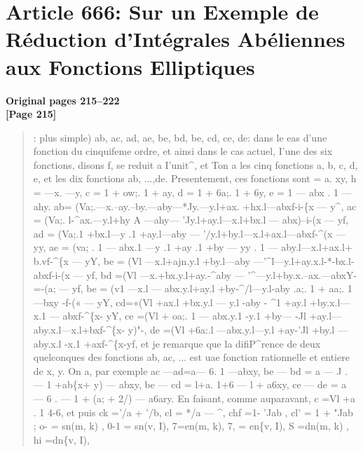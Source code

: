 \documentclass[11pt,a4paper]{book}
\begin{document}
\newpage

\section*{Article 666: Sur un Exemple de R\'eduction d'Int\'egrales Ab\'eliennes aux Fonctions Elliptiques}
\textbf{Original pages 215--222}\\[0.3cm]

\textbf{[Page 215]}\\[0.2cm]
\begin{quote}
:
plus simple) ab, ac, ad, ae, be, bd, be, cd, ce, de: dans le eas d'une fonction du
cinquifeme ordre, et ainsi dans le cas actuel, I'une des six fonctions, disons f, se reduit
a I'unit\textasciicircum{}, et Ton a les cinq fonctions a, b, c, d, e, et les dix fonctions ab, ...,de.
Presentement, ces fonctions sont
=
a. xy,
h =  ---x. ---y,
c = 1 + ow;. 1 + ay,
d = 1 + 6a;. 1 + 6y,
e = 1 --- abx . 1 --- ahy.
ab= (Va;.---x.--ay.--by.---aby---*Jy.---y.l+ax. +hx.l---abxf-i-\{x ---
y\textasciicircum{},
ac = (Va;. l-\textasciicircum{}ax.---y.l+hy A ---ahy--- 'Jy.l+ay.l---x.l+bx.l --- abx)--i-(x --- yf,
ad = (Va;.1 +bx.l---y .1 +ay.l---aby --- '/y.l+by.l---x.l+ax.l---abxf-\textasciicircum{}(x --- yy,
ae = (va; . 1 --- abx.1 ---y .1 +ay .1 +by --- yy . 1 --- aby.l---x.l+ax.l+ b.vf-\textasciicircum{}\{x --- yY,
be = (Vl ---x.l+ajn.y.l +by.l---aby ---'\textasciicircum{}l---y.l+ay.x.l-*-bx.l-abxf-i-(x --- yf,
bd =(Vl ---x.+bx.y.l+ay.-\textasciicircum{}aby --- '\textasciicircum{}---y.l+by.x.--ax.---abxY-=-(a; ---
yf,
be = (v1 ---x.l --- abx.y.l+ay.l +by-\textasciicircum{}/l---y.l-aby .a;. 1 + aa;. 1 ---bxy -f-(« --- yY,
cd=«(Vl +ax.l +bx.y.l --- y.l -aby - \textasciicircum{}1 +ay.l +by.x.l---x.1 --- abxf-\textasciicircum{}\{x- yY,
ce =(Vl + oa;. 1 --- abx.y.1 -y.1 +by--- -Jl +ay.l---aby.x.l---x.l+bxf-\textasciicircum{}\{x- y)"-,
de =(Vl +6a:.l ---abx.y.l---y.l +ay-'Jl +by.l ---aby.x.l -x.1 +axf-\textasciicircum{}\{x-yf,
et je remarque que la difiP\textasciicircum{}rence de deux quelconques des fonctions ab, ac, ... est
uae fonction rationnelle et entiere de x, y. On a, par exemple
ac ---ad=a--- 6. 1 ---abxy,
be --- bd = a --- J . --- 1 +ab\{x+ y) --- abxy,
be --- cd = l+a. 1+6 --- l + a6xy,
ce --- de = a --- 6 . --- 1 + (a; + 2/) --- a6ary.
En faisant, comme auparavant, c =Vl +a
.
1 4-6, et puis
ck ='/a + '/b, cl = */a --- \textasciicircum{},
chf =1- 'Jab , cl' = 1 + "Jab ;
o- = sn(m, k) , 0-1 = sn(v, I),
7=en(m, k), 7, = en\{v, I),
S
=dn(m,
k) , hi
=dn\{v,
I),
\end{quote}
\end{document}

